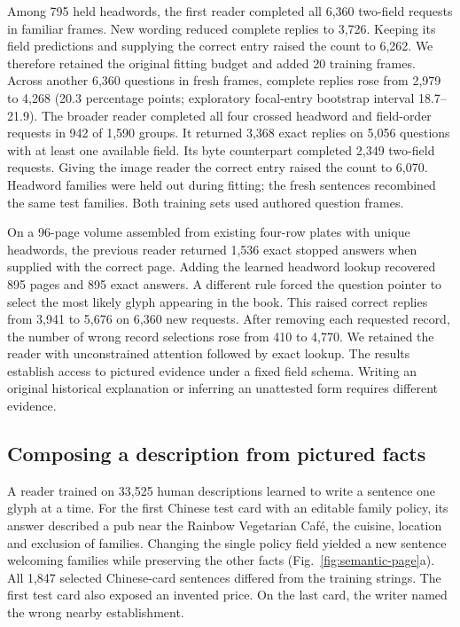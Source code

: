 \documentclass[12pt,a4paper]{article}
\providecommand{\DIFadd}[1]{{\protect\color{blue} \sf #1}} %
\begin{document}
\DIFadd{Among 795 held headwords, the first reader completed all 6,360 two-field requests in familiar frames. New wording reduced complete replies to 3,726. Keeping its field predictions and supplying the correct entry raised the count to 6,262. We therefore retained the original fitting budget and added 20 training frames. Across another 6,360 questions in fresh frames, complete replies rose from 2,979 to 4,268 (20.3 percentage points; exploratory focal-entry bootstrap interval 18.7--21.9). The broader reader completed all four crossed headword and field-order requests in 942 of 1,590 groups. It returned 3,368 exact replies on 5,056 questions with at least one available field. Its byte counterpart completed 2,349 two-field requests. Giving the image reader the correct entry raised the count to 6,070. Headword families were held out during fitting; the fresh sentences recombined the same test families. Both training sets used authored question frames.
}

\DIFadd{On a 96-page volume assembled from existing four-row plates with unique headwords, the previous reader returned 1,536 exact stopped answers when supplied with the correct page. Adding the learned headword lookup recovered 895 pages and 895 exact answers. A different rule forced the question pointer to select the most likely glyph appearing in the book. This raised correct replies from 3,941 to 5,676 on 6,360 new requests. After removing each requested record, the number of wrong record selections rose from 410 to 4,770. We retained the reader with unconstrained attention followed by exact lookup. The results establish access to pictured evidence under a fixed field schema. Writing an original historical explanation or inferring an unattested form requires different evidence.
}

\subsection*{\DIFadd{Composing a description from pictured facts}}
\DIFadd{A reader trained on 33,525 human descriptions learned to write a sentence one glyph at a time. For the first Chinese test card with an editable family policy, its answer described a pub near the Rainbow Vegetarian Caf\'e, the cuisine, location and exclusion of families. Changing the single policy field yielded a new sentence welcoming families while preserving the other facts (Fig.~\ref{fig:semantic-page}a). All 1,847 selected Chinese-card sentences differed from the training strings. The first test card also exposed an invented price. On the last card, the writer named the wrong nearby establishment.
}
\end{document}

